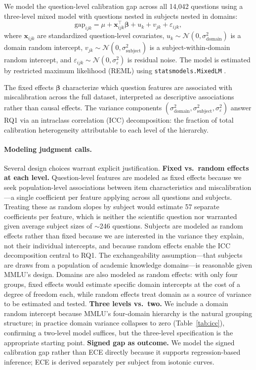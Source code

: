 \documentclass[11pt]{article}
\begin{document}
We model the question-level calibration gap across all 14,042 questions using a
three-level mixed model with questions nested in subjects nested in domains:
\begin{equation}
  \mathrm{gap}_{ijk} = \mu + \mathbf{x}_{ijk}^\top \boldsymbol{\beta}
    + u_k + v_{jk} + \varepsilon_{ijk},
\end{equation}
where $\mathbf{x}_{ijk}$ are standardized question-level covariates,
$u_k \sim \mathcal{N}(0, \sigma^2_{\mathrm{domain}})$ is a domain random intercept,
$v_{jk} \sim \mathcal{N}(0, \sigma^2_{\mathrm{subject}})$ is a subject-within-domain
random intercept, and $\varepsilon_{ijk} \sim \mathcal{N}(0, \sigma^2_\varepsilon)$ is
residual noise. The model is estimated by restricted maximum likelihood (REML) using
\texttt{statsmodels.MixedLM} \citep{raudenbush2002hierarchical}.

The fixed effects $\boldsymbol{\beta}$ characterize which question features are
associated with miscalibration across the full dataset, interpreted as descriptive
associations rather than causal effects. The variance components
$(\sigma^2_{\mathrm{domain}}, \sigma^2_{\mathrm{subject}}, \sigma^2_\varepsilon)$ answer
RQ1 via an intraclass correlation (ICC) decomposition: the fraction of total calibration
heterogeneity attributable to each level of the hierarchy.

\paragraph{Modeling judgment calls.}
Several design choices warrant explicit justification. \textbf{Fixed vs.\ random effects at each level.} Question-level features are modeled as fixed effects because we seek population-level associations between item characteristics and miscalibration---a single coefficient per feature applying across all questions and subjects. Treating these as random slopes by subject would estimate 57 separate coefficients per feature, which is neither the scientific question nor warranted given average subject sizes of $\sim$246 questions. Subjects are modeled as random effects rather than fixed because we are interested in the variance they explain, not their individual intercepts, and because random effects enable the ICC decomposition central to RQ1. The exchangeability assumption---that subjects are draws from a population of academic knowledge domains---is reasonable given MMLU's design. Domains are also modeled as random effects: with only four groups, fixed effects would estimate specific domain intercepts at the cost of a degree of freedom each, while random effects treat domain as a source of variance to be estimated and tested. \textbf{Three levels vs.\ two.} We include a domain random intercept because MMLU's four-domain hierarchy is the natural grouping structure; in practice domain variance collapses to zero (Table~\ref{tab:icc}), confirming a two-level model suffices, but the three-level specification is the appropriate starting point. \textbf{Signed gap as outcome.} We model the signed calibration gap rather than ECE directly because it supports regression-based inference; ECE is derived separately per subject from isotonic curves.
\end{document}
